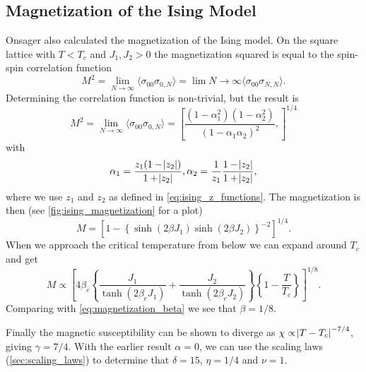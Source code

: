 \documentclass[11pt, a4paper]{report} %
\begin{document}
\subsection{Magnetization of the Ising Model} \label{sec:ising_magnetization}

Onsager also calculated the magnetization of the Ising model.
On the square lattice with \(T < T_c\) and \(J_1, J_2 > 0\) the magnetization squared is equal to the spin-spin correlation function
\begin{equation}
	M^2 = \lim_{N \to \infty} \langle \sigma_{00} \sigma_{0,N} \rangle = \lim{N \to \infty} \langle \sigma_{00} \sigma_{N, N} \rangle.
\end{equation}
Determining the correlation function is non-trivial, but the result is
\begin{equation}
	M^2 = \lim_{N \to \infty} \langle \sigma_{00} \sigma_{0,N} \rangle = \left[ \frac{(1-\alpha_1^2)(1-\alpha_2^2)}{(1-\alpha_1 \alpha_2)^2}, \right]^{1/4}
\end{equation}
with
\begin{equation}
	\alpha_1 = \frac{z_1(1-\abs{z_2})}{1+\abs{z_2}}, \alpha_2 = \frac{1}{z_1}\frac{1-\abs{z_2}}{1+\abs{z_2}},
\end{equation}
where we use \(z_1\) and \(z_2\) as defined in \cref{eq:ising_z_functions}.
The magnetization is then (see \cref{fig:ising_magnetization} for a plot)
\begin{equation}
	M = \left[1 - \left\{\sinh(2\beta J_1)\sinh(2 \beta J_2)\right\}^{-2} \right]^{1/4}.
\end{equation}
When we approach the critical temperature from below we can expand around \(T_c\) and get
\begin{equation}
	M \propto \left[4\beta_c\left\{\frac{J_1}{\tanh(2\beta_c J_1)} + \frac{J_2}{\tanh(2\beta_c J_2)}\right\} \left\{1-\frac{T}{T_c}\right\}\right]^{1/8}.
\end{equation}
Comparing with \cref{eq:magnetization_beta} we see that \(\beta = 1/8\).\cite{wu:1982}

Finally the magnetic susceptibility can be shown to diverge as \(\chi \propto \abs{T - T_c}^{-7/4}\), giving \(\gamma = 7/4\).
With the earlier result \(\alpha=0\), we can use the scaling laws (\cref{sec:scaling_laws}) to determine that \(\delta = 15\), \(\eta = 1/4\) and \(\nu = 1\).\cite{binney:1992}
\end{document}
